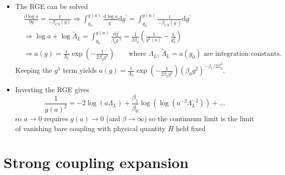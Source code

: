 \begin{itemize}
\begin{itemize}
  \begin{equation}
      \beta_0 = \frac{1}{16 \pi^2}\left[ \frac{11 N_c}{3} - \frac{2 N_f}{3}\right], \quad \beta_1 = \left(\frac{1}{16 \pi^2}\right)^2 \left[\frac{34}{3}N_c^2 - \frac{10}{3}N_c N_f - \frac{N_f}{N_c}(N_c^2 - 1) \right]
  \end{equation}
  which are universal (valid with a lattice regulator) - higher orders are not and depend on the choice of $H$ and the regulator
  \end{itemize}
  \item The RGE can be solved
  \begin{align}
      &\frac{\partial \log a}{\partial g} = \frac{1}{-\beta_{CS}(g)} \Rightarrow \int_{g_0}^{g(a)} \frac{\text{d}\log a}{\text{g}^\prime}\text{d}g^\prime = \int_{g_0}^{g(a)}\frac{1}{-\beta_{CS}(g^\prime)}\text{d}g^\prime \nonumber \\
      &\Rightarrow \log a + \log \tilde{\Lambda}_L = \int_{g_0}^{g(a)}\frac{\text{d}g^\prime}{\beta_0 g^{\prime 3}} = \frac{1}{2 \beta_0}\left(\frac{1}{g^2(a)}-\frac{1}{g_0^2}\right) \nonumber \\
      &\Rightarrow a(g) = \frac{1}{\Lambda_L}\exp(-\frac{1}{2 \beta_0 g^2})\qquad \text{where $\Lambda_L$, $\tilde{\Lambda}_L=a(g_0)$ are integration constants.}
  \end{align}
  Keeping the $g^5$ term yields $a(g) = \frac{1}{\Lambda_L}\exp\left(-\frac{1}{2 \beta_0 g^2}\right) (\beta_0 g^2)^{-\beta_1/2\beta_0^2}$.
  \item Inverting the RGE gives
  \begin{equation}
      \frac{1}{g(a)^2} = - 2 \log(a\Lambda_L) + \frac{\beta_1}{\beta_0}\log(\log(a^{-2}\Lambda_L^{-2}))+\ldots
  \end{equation}
  so $a \rightarrow 0$ requires $g(a) \rightarrow 0$ (and $\beta \rightarrow \infty$) so the continuum limit is the limit of vanishing bare coupling with physical quantity $H$ held fixed
\end{itemize}



\section{Strong coupling expansion}


